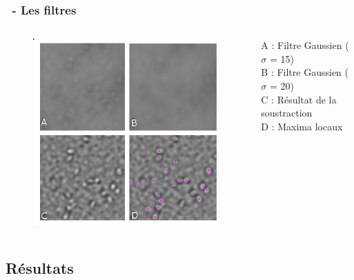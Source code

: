 \documentclass[11pt]{beamer}
\begin{document}
\begin{frame}
\frametitle{\subsecname ~- Les filtres}
	\begin{columns}
		\begin{column}{7cm}
			\begin{figure}
				\includegraphics[scale=0.45]{Montage.png}
			\end{figure}
		\end{column}
		\begin{column}{5cm}
		A : Filtre Gaussien ($\sigma$ = 15)\\
		
		B : Filtre Gaussien ($\sigma$ = 20)\\

		C : Résultat de la soustraction \\

		D : Maxima locaux\\
		\end{column}
	\end{columns}
\end{frame}

\subsection{Résultats}
\end{document}
